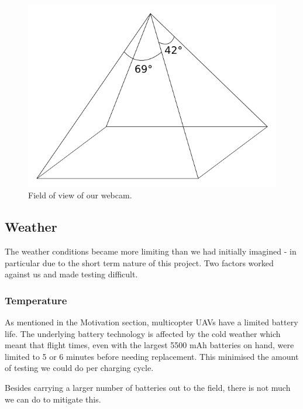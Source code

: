 \documentclass[10pt]{scrartcl} %
\begin{document}


\begin{figure}[h]
    \centering
    \includegraphics{images/fov.png}
    \caption{Field of view of our webcam.}
    \label{fig:fov}
\end{figure}

\subsection{Weather}
The weather conditions became more limiting than we had initially imagined - in particular due to the short term nature of this project. Two factors worked against us and made testing difficult.

\subsubsection{Temperature}
As mentioned in the Motivation section, multicopter UAVs have a limited battery life. The underlying battery technology is affected by the cold weather which meant that flight times, even with the largest 5500 mAh batteries on hand, were limited to 5 or 6 minutes before needing replacement. This minimised the amount of testing we could do per charging cycle.

Besides carrying a larger number of batteries out to the field, there is not much we can do to mitigate this.
\end{document}

